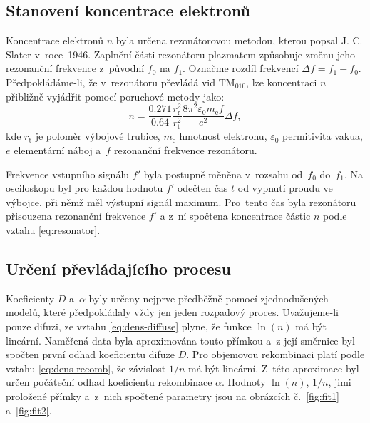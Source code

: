 \documentclass{protokol}
\newcommand\emass{m_\mathrm{e}}
\newcommand\elemcharge{e}
\newcommand\permitvac{\varepsilon_0}
\newcommand\tm{t}
\newcommand\freq{f}
\newcommand\freqbase{\freq_0}
\newcommand\freqplas{\freq_1}
\newcommand\freqsig{\freq'}
\newcommand\deltafreq{\Delta\freq}
\newcommand\dens{n}
\newcommand\diffuse{D}
\newcommand\recomb{\alpha}
\newcommand\tuberadius{r_\mathrm{t}}
\newcommand\resradius{r_\mathrm{r}}
\begin{document}
\subsection{Stanovení koncentrace elektronů}
Koncentrace elektronů $\dens$ byla určena rezonátorovou metodou,
kterou popsal J. C. Slater v~roce~1946.
Zaplnění části rezonátoru plazmatem způsobuje změnu jeho rezonanční
frekvence z~původní $\freqbase$ na $\freqplas$.
Označme rozdíl frekvencí $\deltafreq = \freqplas - \freqbase$.
Předpokládáme-li, že v~rezonátoru převládá vid $\mathrm{TM}_{010}$,
lze koncentraci $\dens$ přibližně vyjádřit pomocí poruchové metody jako:
\begin{equation}
	\label{eq:resonator}
	\dens=\frac{\num{0.271}}{\num{0.64}} \frac{\resradius^2}{\tuberadius^2}
		\frac{8\pi^2 \permitvac\emass\freq}{\elemcharge^2} \deltafreq,
\end{equation}
kde $\tuberadius$ je poloměr výbojové trubice, $\emass$ hmotnost elektronu,
$\permitvac$ permitivita vakua, $\elemcharge$ elementární náboj
a~$\freq$ rezonanční frekvence rezonátoru.

Frekvence vstupního signálu $\freqsig$ byla postupně měněna v~rozsahu
od~$\freqbase$ do~$\freqplas$.
Na osciloskopu byl pro každou hodnotu $\freqsig$ odečten čas $\tm$ od vypnutí
proudu ve výbojce, při němž měl výstupní signál maximum.
Pro~tento čas byla rezonátoru přisouzena rezonanční frekvence $\freqsig$
a z~ní spočtena koncentrace částic $\dens$ podle vztahu \eqref{eq:resonator}.

% 	

\subsection{Určení převládajícího procesu}
Koeficienty $\diffuse$ a~$\recomb$ byly určeny nejprve předběžně pomocí
zjednodušených modelů, které předpokládaly vždy jen jeden rozpadový proces.
Uvažujeme-li pouze difuzi, ze vztahu \eqref{eq:dens-diffuse} plyne,
že funkce $\ln(\dens)$ má být lineární.
Naměřená data byla aproximována touto přímkou a~z její směrnice
byl spočten první odhad koeficientu difuze $\diffuse$.
Pro objemovou rekombinaci platí podle vztahu \eqref{eq:dens-recomb},
že závislost $1/\dens$ má být lineární.
Z~této aproximace byl určen počáteční odhad koeficientu rekombinace $\recomb$.
Hodnoty $\ln(\dens)$, $1/\dens$, jimi proložené přímky a~z~nich spočtené
parametry jsou na obrázcích č.~\ref{fig:fit1} a~\ref{fig:fit2}.
\end{document}
